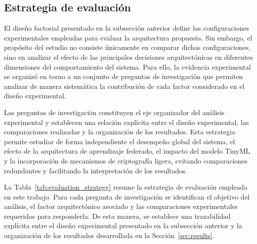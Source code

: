 \documentclass[journal,article,submit,moreauthors]{Definitions/mdpi}
\begin{document}
\subsection{Estrategia de evaluación}
El diseño factorial presentado en la subsección anterior define las configuraciones experimentales empleadas para evaluar la arquitectura propuesta. Sin embargo, el propósito del estudio no consiste únicamente en comparar dichas configuraciones, sino en analizar el efecto de las principales decisiones arquitectónicas en diferentes dimensiones del comportamiento del sistema. Para ello, la evidencia experimental se organizó en torno a un conjunto de preguntas de investigación que permiten analizar de manera sistemática la contribución de cada factor considerado en el diseño experimental.

Las preguntas de investigación constituyen el eje organizador del análisis experimental y establecen una relación explícita entre el diseño experimental, las comparaciones realizadas y la organización de los resultados. Esta estrategia permite estudiar de forma independiente el desempeño global del sistema, el efecto de la arquitectura de aprendizaje federado, el impacto del modelo TinyML y la incorporación de mecanismos de criptografía ligera, evitando comparaciones redundantes y facilitando la interpretación de los resultados.

La Tabla~\ref{tab:evaluation_strategy} resume la estrategia de evaluación empleada en este trabajo. Para cada pregunta de investigación se identifican el objetivo del análisis, el factor arquitectónico asociado y las comparaciones experimentales requeridas para responderla. De esta manera, se establece una trazabilidad explícita entre el diseño experimental presentado en la subsección anterior y la organización de los resultados desarrollada en la Sección~\ref{sec:results}.
\end{document}
